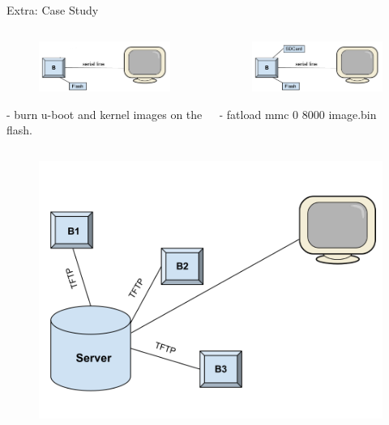 \documentclass{workshop}
\begin{document}
\begin{frame}{Extra: Case Study}
  \begin{columns}
    \pause
    \begin{column}[l]{0.45\textwidth}
      \begin{figure}
         \includegraphics[scale=0.17]{img/flash.png}
      \end{figure}
      \begin{center}
        \tiny{- burn u-boot and kernel images on the flash.}
      \end{center}
    \end{column}
    \pause
    \begin{column}[l]{0.45\textwidth}
      \begin{figure}
         \includegraphics[scale=0.17]{img/sdcard.png}
      \end{figure}
      \begin{center}
        \tiny{- fatload mmc 0 8000 image.bin}
      \end{center}
    \end{column}
  \end{columns}
     \pause
     \begin{figure}
         \includegraphics[scale=0.17]{img/complex.png}

\end{figure}
\end{frame}
\end{document}
